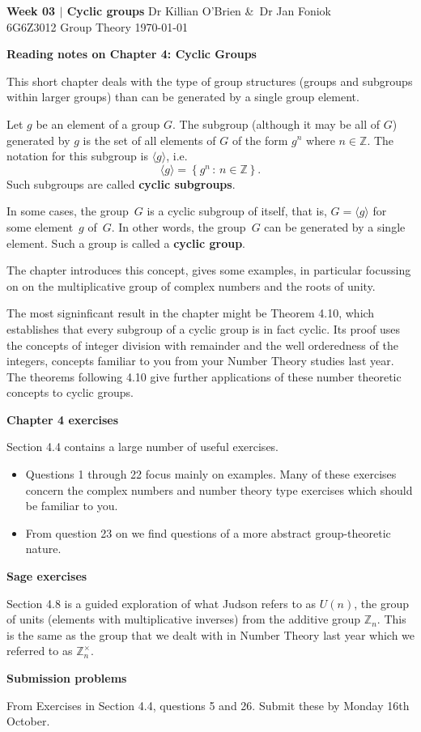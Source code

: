\documentclass[oneside,10pt]{amsart}
\newcommand{\cbox}[1]{\begin{tcolorbox}[left=0.5mm,right=0.5mm,top=0.5mm,bottom=0.5mm, boxsep=2pt, boxrule=0pt,colback=black]\color{white}\sffamily #1 \end{tcolorbox}}
\newcommand{\tuttitle}[4]{\cbox{\textbf{#1} \hfill {#2}\\{#3} \hfill {\Small #4}}\vskip 20pt}
\newcommand{\topic}[1]{\bigbreak\cbox{\textbf{#1}}\medskip}
\begin{document}
\tuttitle{Week 03 $|$ Cyclic groups}{Dr Killian O'Brien \&\ Dr Jan Foniok}{6G6Z3012 Group Theory}{\today}

\topic{Reading notes on Chapter 4: Cyclic Groups}
This short chapter deals with the type of group structures (groups and subgroups within larger groups) than can be generated by a single group element.

Let $g$ be an element of a group $G$. The subgroup (although it may be all of $G$) generated by $g$ is the set of all elements of $G$ of the form $g^n$ where $n \in \mathbb{Z}$. The notation for this subgroup is $\langle g \rangle$, i.e.
$$\langle g \rangle = \left \{ g^n \, : \, n \in \mathbb{Z} \right \}.$$ Such subgroups are called
\textbf{cyclic subgroups}.

In some cases, the group~$G$ is a cyclic subgroup of itself, that is,
$G=\langle g \rangle$ for some element~$g$ of~$G$.
In other words, the group~$G$ can be generated by a single element.
Such a group is called a \textbf{cyclic group}.

The chapter introduces this concept, gives some examples, in particular focussing on on the multiplicative group of complex numbers and the roots of unity.

The most signinficant result in the chapter might be Theorem 4.10,
which establishes that every subgroup of a cyclic group is in fact cyclic.
Its proof uses the concepts of integer division with remainder and the well orderedness of the integers,
concepts familiar to you from your Number Theory studies last year.
The theorems following 4.10 give further applications of these number theoretic concepts to cyclic groups.

\vskip 4pt

\topic{Chapter 4 exercises}
Section 4.4 contains a large number of useful exercises.

\begin{itemize}
\item
Questions 1 through 22 focus mainly on examples. Many of these exercises concern the complex numbers and number theory type exercises which should be familiar to you.
\item
From question 23 on we find questions of a more abstract group-theoretic nature.
\end{itemize}

\vskip 4pt

\topic{Sage exercises}
Section 4.8 is a guided exploration of what Judson refers to as $U(n)$, the group of units (elements with multiplicative inverses) from the additive group $\mathbb{Z}_n$. This is the same as the group that we dealt with in Number Theory last year which we referred to as $\mathbb{Z}_n^\times$.

\topic{Submission problems}

From Exercises in Section 4.4, questions 5 and 26. Submit these by Monday 16th October.
\end{document}
